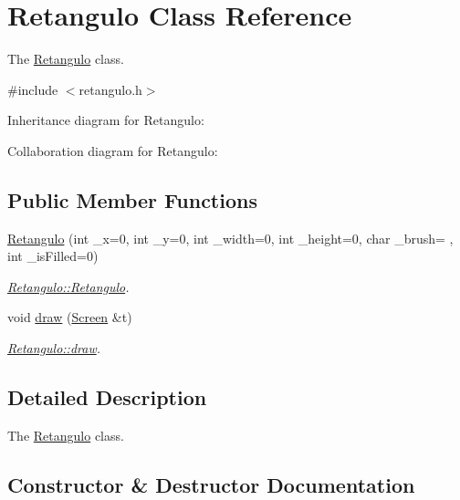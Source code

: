 \hypertarget{classRetangulo}{}\section{Retangulo Class Reference}
\label{classRetangulo}


The \hyperlink{classRetangulo}{Retangulo} class.  




{\ttfamily \#include $<$retangulo.\+h$>$}



Inheritance diagram for Retangulo\+:


Collaboration diagram for Retangulo\+:
\subsection*{Public Member Functions}
\begin{DoxyCompactItemize}
\item 
\hyperlink{classRetangulo_a1822efbf6e65d30ef37b8d8ef5949278}{Retangulo} (int \+\_\+x=0, int \+\_\+y=0, int \+\_\+width=0, int \+\_\+height=0, char \+\_\+brush=\textquotesingle{} \textquotesingle{}, int \+\_\+is\+Filled=0)
\begin{DoxyCompactList}\small\item\em \hyperlink{classRetangulo_a1822efbf6e65d30ef37b8d8ef5949278}{Retangulo\+::\+Retangulo}. \end{DoxyCompactList}\item 
void \hyperlink{classRetangulo_ac088dd6d3f4f3d3f80363a868c2e74f1}{draw} (\hyperlink{classScreen}{Screen} \&t)
\begin{DoxyCompactList}\small\item\em \hyperlink{classRetangulo_ac088dd6d3f4f3d3f80363a868c2e74f1}{Retangulo\+::draw}. \end{DoxyCompactList}\end{DoxyCompactItemize}


\subsection{Detailed Description}
The \hyperlink{classRetangulo}{Retangulo} class. 

\subsection{Constructor \& Destructor Documentation}
\mbox{\label{classRetangulo_a1822efbf6e65d30ef37b8d8ef5949278}} 

